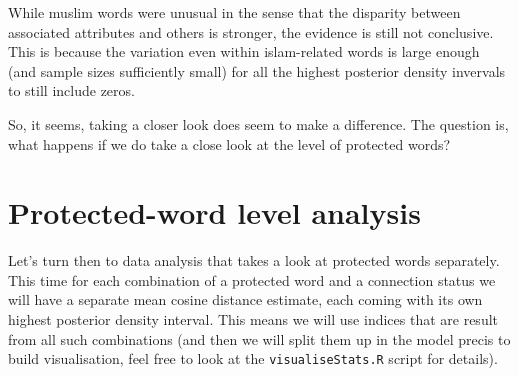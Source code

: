 \documentclass[12pt,]{book}
\begin{document}
\normalsize

While muslim words were unusual in the sense that the disparity between
associated attributes and others is stronger, the evidence is still not
conclusive. This is because the variation even within islam-related
words is large enough (and sample sizes sufficiently small) for all the
highest posterior density invervals to still include zeros.

So, it seems, taking a closer look does seem to make a difference. The
question is, what happens if we do take a close look at the level of
protected words?

\chapter{Protected-word level
analysis}\label{protected-word-level-analysis}

Let's turn then to data analysis that takes a look at protected words
separately. This time for each combination of a protected word and a
connection status we will have a separate mean cosine distance estimate,
each coming with its own highest posterior density interval. This means
we will use indices that are result from all such combinations (and then
we will split them up in the model precis to build visualisation, feel
free to look at the \texttt{visualiseStats.R} script for details).

\vspace{1mm} \footnotesize
\end{document}
